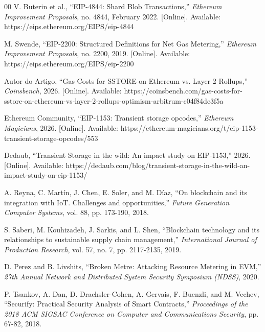 \documentclass[conference]{IEEEtran}
\begin{document}
\begin{thebibliography}{00}
V. Buterin et al., ``EIP-4844: Shard Blob Transactions,'' \textit{Ethereum Improvement Proposals}, no. 4844, February 2022. [Online]. Available: https://eips.ethereum.org/EIPS/eip-4844

M. Swende, ``EIP-2200: Structured Definitions for Net Gas Metering,'' \textit{Ethereum Improvement Proposals}, no. 2200, 2019. [Online]. Available: https://eips.ethereum.org/EIPS/eip-2200

Autor do Artigo, ``Gas Costs for SSTORE on Ethereum vs. Layer 2 Rollups,'' \textit{Coinsbench}, 2026. [Online]. Available: https://coinsbench.com/gas-costs-for-sstore-on-ethereum-vs-layer-2-rollups-optimism-arbitrum-c04f84de3f5a

Ethereum Community, ``EIP-1153: Transient storage opcodes,'' \textit{Ethereum Magicians}, 2026. [Online]. Available: https://ethereum-magicians.org/t/eip-1153-transient-storage-opcodes/553

Dedaub, ``Transient Storage in the wild: An impact study on EIP-1153,'' 2026. [Online]. Available: https://dedaub.com/blog/transient-storage-in-the-wild-an-impact-study-on-eip-1153/

A. Reyna, C. Martín, J. Chen, E. Soler, and M. Díaz, ``On blockchain and its integration with IoT. Challenges and opportunities,'' \textit{Future Generation Computer Systems}, vol. 88, pp. 173-190, 2018.

S. Saberi, M. Kouhizadeh, J. Sarkis, and L. Shen, ``Blockchain technology and its relationships to sustainable supply chain management,'' \textit{International Journal of Production Research}, vol. 57, no. 7, pp. 2117-2135, 2019.

D. Perez and B. Livshits, ``Broken Metre: Attacking Resource Metering in EVM,'' \textit{27th Annual Network and Distributed System Security Symposium (NDSS)}, 2020.


P. Tsankov, A. Dan, D. Drachsler-Cohen, A. Gervais, F. Buenzli, and M. Vechev, ``Securify: Practical Security Analysis of Smart Contracts,'' \textit{Proceedings of the 2018 ACM SIGSAC Conference on Computer and Communications Security}, pp. 67-82, 2018.
\end{thebibliography}
\end{document}
